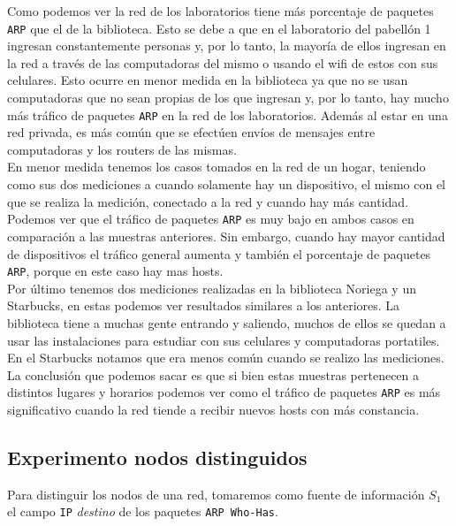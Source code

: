 Como podemos ver la red de los laboratorios tiene más porcentaje de paquetes \texttt{ARP} que el de la biblioteca. Esto se debe a que en el laboratorio del pabellón 1 ingresan
constantemente personas y, por lo tanto, la mayoría de ellos ingresan en la red a través de las computadoras del mismo o usando el wifi de estos con sus celulares. Esto
ocurre en menor medida en la biblioteca ya que no se usan computadoras que no sean propias de los que ingresan y, por lo tanto, hay mucho más tráfico de paquetes \texttt{ARP} en la red
de los laboratorios. Además al estar en una red privada, es más común que se efectúen envíos de mensajes entre computadoras y los routers de las mismas.\\

En menor medida tenemos los casos tomados en la red de un hogar, teniendo como sus dos mediciones a cuando solamente hay un dispositivo, el mismo con el que se realiza la medición,
conectado a la red y cuando hay más cantidad. Podemos ver que el tráfico de paquetes \texttt{ARP} es muy bajo en ambos casos en comparación a las muestras anteriores. Sin embargo,
cuando hay mayor cantidad de dispositivos el tráfico general aumenta y también el porcentaje de paquetes \texttt{ARP}, porque en este caso hay mas hosts.\\

Por último tenemos dos mediciones realizadas en la biblioteca Noriega y un Starbucks, en estas podemos ver resultados similares a los anteriores. La biblioteca tiene a muchas
gente entrando y saliendo, muchos de ellos se quedan a usar las instalaciones para estudiar con sus celulares y computadoras portatiles. En el Starbucks notamos que era menos
común cuando se realizo las mediciones.\\

La conclusión que podemos sacar es que si bien estas muestras pertenecen a distintos lugares y horarios podemos ver como el tráfico de paquetes \texttt{ARP} es más significativo cuando
la red tiende a recibir nuevos hosts con más constancia.



\subsection{Experimento nodos distinguidos}

Para distinguir los nodos de una red, tomaremos como fuente de información $S_1$ el campo
\texttt{IP} \textit{destino} de los paquetes \texttt{ARP Who-Has}.


